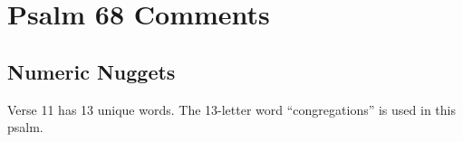 \section{Psalm 68 Comments}

\subsection{Numeric Nuggets}
Verse 11 has 13 unique words. The 13-letter word ``congregations'' is used in this psalm.